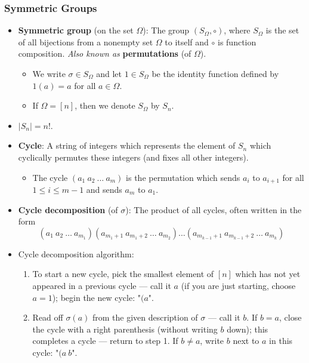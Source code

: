 \documentclass[../main.tex]{subfiles}
\begin{document}
\subsubsection{Symmetric Groups}
\begin{itemize}
    \item \textbf{Symmetric group} (on the set $\Omega$): The group $(S_\Omega,\circ)$, where $S_\Omega$ is the set of all bijections from a nonempty set $\Omega$ to itself and $\circ$ is function composition. \emph{Also known as} \textbf{permutations} (of $\Omega$).
    \begin{itemize}
        \item We write $\sigma\in S_\Omega$ and let $1\in S_\Omega$ be the identity function defined by $1(a)=a$ for all $a\in\Omega$.
        \item If $\Omega=[n]$, then we denote $S_\Omega$ by $S_n$.
    \end{itemize}
    \item $|S_n|=n!$.
    \item \textbf{Cycle}: A string of integers which represents the element of $S_n$ which cyclically permutes these integers (and fixes all other integers).
    \begin{itemize}
        \item The cycle $(a_1\ a_2\ \dots\ a_m)$ is the permutation which sends $a_i$ to $a_{i+1}$ for all $1\leq i\leq m-1$ and sends $a_m$ to $a_1$.
    \end{itemize}
    \item \textbf{Cycle decomposition} (of $\sigma$): The product of all cycles, often written in the form
    \begin{equation*}
        (a_1\ a_2\ \dots\ a_{m_1})(a_{m_1+1}\ a_{m_1+2}\ \dots\ a_{m_2})\dots(a_{m_{k-1}+1}\ a_{m_{k-1}+2}\ \dots\ a_{m_k})
    \end{equation*}
    \item Cycle decomposition algorithm:
    \begin{enumerate}
        \item To start a new cycle, pick the smallest element of $[n]$ which has not yet appeared in a previous cycle --- call it $a$ (if you are just starting, choose $a=1$); begin the new cycle: "$(a$".
        \item Read off $\sigma(a)$ from the given description of $\sigma$ --- call it $b$. If $b=a$, close the cycle with a right parenthesis (without writing $b$ down); this completes a cycle --- return to step 1. If $b\neq a$, write $b$ next to $a$ in this cycle: "$(a\ b$".

\end{enumerate}
\end{itemize}
\end{document}
